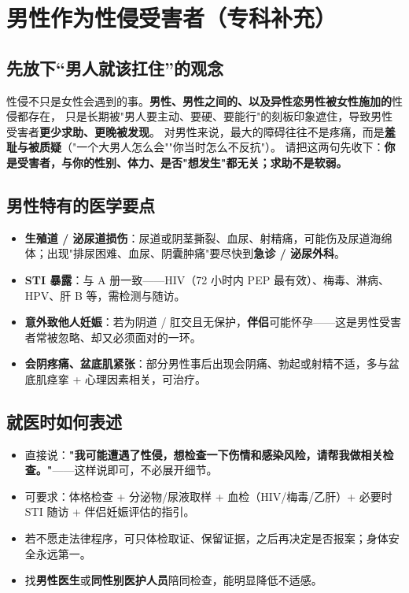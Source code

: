 
\chapter{男性作为性侵受害者（专科补充）}

\section{先放下“男人就该扛住”的观念}
性侵不只是女性会遇到的事。\textbf{男性、男性之间的、以及异性恋男性被女性施加的}性侵都存在，
只是长期被"男人要主动、要硬、要能行"的刻板印象遮住，导致男性受害者\textbf{更少求助、更晚被发现}。
对男性来说，最大的障碍往往不是疼痛，而是\textbf{羞耻与被质疑}（"一个大男人怎么会""你当时怎么不反抗"）。
请把这两句先收下：\textbf{你是受害者，与你的性别、体力、是否"想发生"都无关；求助不是软弱。}

\section{男性特有的医学要点}
\begin{itemize}
  \item \textbf{生殖道 / 泌尿道损伤}：尿道或阴茎撕裂、血尿、射精痛，可能伤及尿道海绵体；出现"排尿困难、血尿、阴囊肿痛"要尽快到\textbf{急诊 / 泌尿外科}。
  \item \textbf{STI 暴露}：与 A 册一致——HIV（72 小时内 PEP 最有效）、梅毒、淋病、HPV、肝 B 等，需检测与随访。
  \item \textbf{意外致他人妊娠}：若为阴道 / 肛交且无保护，\textbf{伴侣}可能怀孕——这是男性受害者常被忽略、却又必须面对的一环。
  \item \textbf{会阴疼痛、盆底肌紧张}：部分男性事后出现会阴痛、勃起或射精不适，多与盆底肌痉挛 + 心理因素相关，可治疗。
\end{itemize}

\section{就医时如何表述}
\begin{itemize}
  \item 直接说：\textbf{"我可能遭遇了性侵，想检查一下伤情和感染风险，请帮我做相关检查。"}——这样说即可，不必展开细节。
  \item 可要求：体格检查 + 分泌物/尿液取样 + 血检（HIV/梅毒/乙肝）+ 必要时 STI 随访 + 伴侣妊娠评估的指引。
  \item 若不愿走法律程序，可只体检取证、保留证据，之后再决定是否报案；身体安全永远第一。
  \item 找\textbf{男性医生}或\textbf{同性别医护人员}陪同检查，能明显降低不适感。
\end{itemize}

